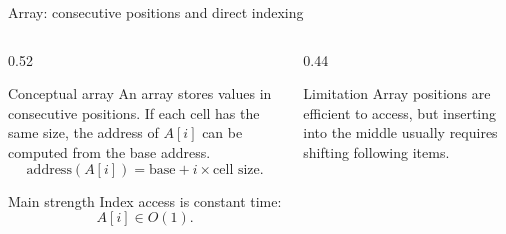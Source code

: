 \documentclass[aspectratio=169]{beamer}
\begin{document}
\begin{frame}{Array: consecutive positions and direct indexing}
\small
\begin{columns}[T,onlytextwidth]
\begin{column}{0.52\textwidth}
\begin{block}{Conceptual array}
An array stores values in consecutive positions. If each cell has the same size,
the address of $A[i]$ can be computed from the base address.
\[
\text{address}(A[i])=\text{base}+i\times\text{cell size}.
\]
\end{block}
\begin{exampleblock}{Main strength}
Index access is constant time:
\[
A[i] \in O(1).
\]
\end{exampleblock}
\end{column}
\begin{column}{0.44\textwidth}
\begin{center}
\end{center}
\begin{alertblock}{Limitation}
Array positions are efficient to access, but inserting into the middle usually
requires shifting following items.
\end{alertblock}
\end{column}
\end{columns}
\end{frame}
\end{document}
